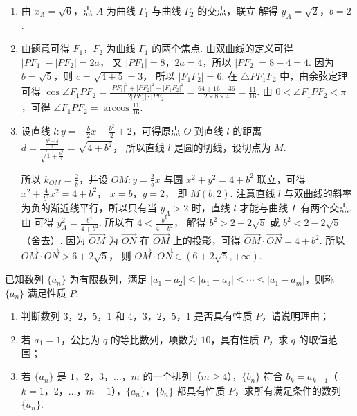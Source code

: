 \begin{solution}
\begin{enumerate}
\item 由 \(x_A=\sqrt6\)，点 \(A\) 为曲线 \(\Gamma_1\) 与曲线 \(\Gamma_2\) 的交点，联立
解得
\(y_A=\sqrt2\)，\(b=2\).

\item 由题意可得 \(F_1\)，\(F_2\) 为曲线 \(\Gamma_1\) 的两个焦点.
由双曲线的定义可得
\(|PF_1|-|PF_2|=2a\)，
又 \(|PF_1|=8\)，\(2a=4\)，所以
\(|PF_2|=8-4=4\).
因为 \(b=\sqrt5\)，则
\(c=\sqrt{4+5}=3\)，
所以
\(|F_1F_2|=6\).
在 \(\triangle PF_1F_2\) 中，由余弦定理可得
\(\cos\angle F_1PF_2=\frac{|PF_1|^2+|PF_2|^2-|F_1F_2|^2}{2|PF_1|\cdot|PF_2|}=\frac{64+16-36}{2\times8\times4}=\frac{11}{16}\).
由 \(0<\angle F_1PF_2<\pi\)，可得
\(\angle F_1PF_2=\arccos\frac{11}{16}\).

\item 设直线 \(l:y=-\frac{b}{2}x+\frac{b^2}{2}+2\)，可得原点 \(O\) 到直线 \(l\) 的距离
\(d=\frac{\frac{b^2+4}{2}}{\sqrt{1+\frac{b^2}{4}}}=\sqrt{4+b^2}\)，
所以直线 \(l\) 是圆的切线，设切点为 \(M\).

所以 \(k_{OM}=\frac{2}{b}\)，并设 \(OM:y=\frac{2}{b}x\) 与圆 \(x^2+y^2=4+b^2\) 联立，可得
\(x^2+\frac{4}{b^2}x^2=4+b^2\)，
\(x=b\)，\(y=2\)，
即 \(M(b,2)\).
注意直线 \(l\) 与双曲线的斜率为负的渐近线平行，所以只有当 \(y_A>2\) 时，直线 \(l\) 才能与曲线 \(\Gamma\) 有两个交点.
由
可得
\(y_A^2=\frac{b^4}{4+b^2}\).
所以有
\(4<\frac{b^4}{4+b^2}\)，
解得
\(b^2>2+2\sqrt5\)
或 \(b^2<2-2\sqrt5\)（舍去）.
因为 \(\overrightarrow{OM}\) 为 \(\overrightarrow{ON}\) 在 \(\overrightarrow{OM}\) 上的投影，可得
\(\overrightarrow{OM}\cdot\overrightarrow{ON}=4+b^2\).
所以
\(\overrightarrow{OM}\cdot\overrightarrow{ON}>6+2\sqrt5\)，
则
\(\overrightarrow{OM}\cdot\overrightarrow{ON}\in(6+2\sqrt5,+\infty)\).
\end{enumerate}
\end{solution}

\begin{problem}
已知数列 \(\{a_n\}\) 为有限数列，满足 \(|a_1-a_2|\le|a_1-a_3|\le\cdots\le|a_1-a_m|\)，则称 \(\{a_n\}\) 满足性质 \(P\).

\begin{enumerate}
\item 判断数列 \(3\)，\(2\)，\(5\)，\(1\) 和 \(4\)，\(3\)，\(2\)，\(5\)，\(1\) 是否具有性质 \(P\)，请说明理由；
\item 若 \(a_1=1\)，公比为 \(q\) 的等比数列，项数为 \(10\)，具有性质 \(P\)，求 \(q\) 的取值范围；
\item 若 \(\{a_n\}\) 是 \(1\)，\(2\)，\(3\)，\(\ldots\)，\(m\) 的一个排列（\(m\ge4\)），\(\{b_n\}\) 符合 \(b_k=a_{k+1}\)（\(k=1\)，\(2\)，\(\ldots\)，\(m-1\)），\(\{a_n\}\)，\(\{b_n\}\) 都具有性质 \(P\)，求所有满足条件的数列 \(\{a_n\}\).
\end{enumerate}
\end{problem}

